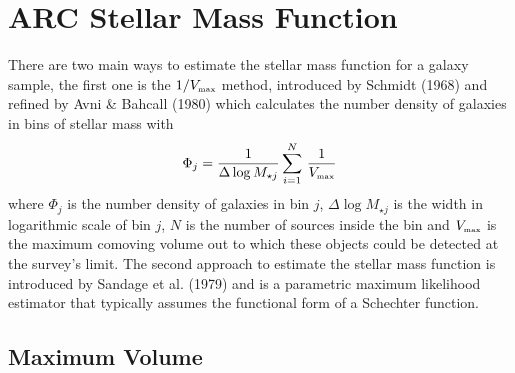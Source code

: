 

\section{ARC Stellar Mass Function} \label{sec:Res/ARC_SMF}
There are two main ways to estimate the stellar mass function for a galaxy sample\cite{Leja2020}, the first one is the $1/V_{\mbox{\tiny{max}}}$ method, introduced by Schmidt (1968)\cite{Schm1968} and refined by Avni \& Bahcall (1980)\cite{Avni1980} which calculates the number density of galaxies in bins of stellar mass with 
\begin{equation}
    \Phi_j = \dfrac{1}{\Delta \log M_{\star j}} \sum_{i=1}^N \, \dfrac{1}{V_{\mbox{\tiny{max}}}} \label{eq:SMF_schm} 
\end{equation} 
where $\Phi_j$ is the number density of galaxies in bin $j$, $\Delta \log M_{\star j}$ is the width in logarithmic scale of bin $j$, $N$ is the number of sources inside the bin and $V_{\mbox{\tiny{max}}}$ is the maximum comoving volume out to which these objects could be detected at the survey's limit. 
The second approach to estimate the stellar mass function is introduced by Sandage et al. (1979)\cite{Sand1979} and is a parametric maximum likelihood estimator that typically assumes the functional form of a Schechter\cite{Sche1976} function. 

\subsection{Maximum Volume} \label{subsec:Res/V_max}
